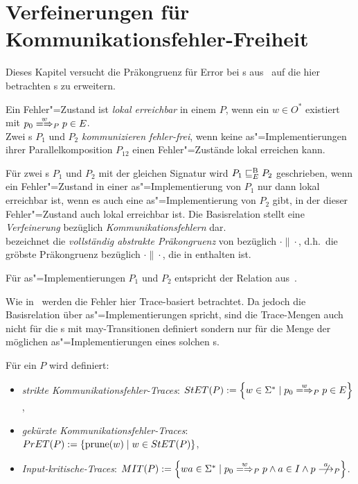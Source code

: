 \chapter{Verfeinerungen für Kommunikationsfehler-Freiheit}

Dieses Kapitel versucht die Präkongruenz für Error bei \EIO{}s
aus~\cite{Schinko2016BA} auf die hier betrachten \MEIO{}s zu erweitern.

\begin{Def}
  Ein Fehler"=Zustand ist \emph{lokal erreichbar} in einem \MEIO{} $P$, wenn
  ein $w\in O^*$ existiert mit $p_0 \weakmay[w]_{P} p\in E$.\\
  Zwei \MEIO{}s $P_1$ und $P_2$ \emph{kommunizieren fehler-frei}, wenn keine
  as"=Implementierungen ihrer Parallelkomposition $P_{12}$ einen
  Fehler"=Zustände lokal erreichen kann.
\end{Def}

\begin{Def}
  \label{EBRelDef}
  Für zwei \MEIO{}s $P_1$ und $P_2$ mit der gleichen Signatur wird $P_1 \sqsubseteq  _E^\mathrm{B}{} P_2$
  geschrieben, wenn ein Fehler"=Zustand in einer as"=Implementierung
  von $P_1$ nur dann lokal erreichbar ist, wenn es auch eine as"=Implementierung
  von $P_2$ gibt, in der dieser Fehler"=Zustand auch lokal
  erreichbar ist. Die Basisrelation stellt eine \emph{Verfeinerung} bezüglich
  \emph{Kommunikationsfehlern} dar.\\
  \ECRel{} bezeichnet die \emph{vollständig abstrakte Präkongruenz} von
  \EBRel{} bezüglich $\cdot\|\cdot$, d.h.\ die gröbste Präkongruenz bezüglich
  $\cdot\|\cdot$, die in \EBRel{} enthalten ist.
\end{Def}

Für as"=Implementierungen $P_1$ und $P_2$ entspricht \EBRel{} der Relation
\EBbaRel{} aus~\cite{Schinko2016BA}.

Wie in~\cite{Schinko2016BA} werden die Fehler hier Trace-basiert betrachtet. Da
jedoch die Basisrelation über as"=Implementierungen spricht, sind die Trace-Mengen
auch nicht für die \MEIO{}s mit may-Transitionen definiert sondern nur für die
Menge der möglichen as"=Implementierungen eines solchen \MEIO{}s.

\begin{Def}
  Für ein \MEIO{} $P$ wird definiert:
  \begin{itemize}
    \item \emph{strikte Kommunikationsfehler-Traces}: $\StET (P) :=
      \left\{w\in\Sigma ^* \mid p_0 \weakmay[w]_P p \in E\right\}$,
    \item \emph{gekürzte Kommunikationsfehler-Traces}: $PrET (P) :=
      \left\{\mathrm{prune} (w) \mid w\in StET (P)\right\}$,
    \item \emph{Input-kritische-Traces}: $\MIT (P) := \left\{wa\in\Sigma ^*
      \mid p_0 \weakmay[w]_P p \land a\in I\land p\nmust[a]_P \right\}$.
  \end{itemize}
\end{Def}

